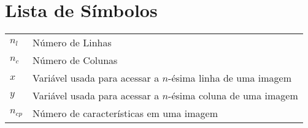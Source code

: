 \documentclass[11pt,twoside,a4paper]{book}
\renewcommand{\chaptermark}[1]{\markboth{\MakeUppercase{#1}}{}}
\begin{document}
\chapter{Lista de Símbolos}
\begin{tabular}{ll}
        $n_l$   & Número de Linhas\\
        $n_c$   & Número de Colunas\\
        $x$     & Variável usada para acessar a $n$-ésima linha de uma imagem \\
        $y$     & Variável usada para acessar a $n$-ésima coluna de uma imagem \\
        $n_{cp}$  & Número de características em uma imagem \\
\end{tabular}

\listoffigures            
\listoftables            

\mainmatter

\fancyhead[RE,LO]{\thesection}

\singlespacing              %


\renewcommand{\chaptermark}[1]{\markboth{\MakeUppercase{\appendixname\ \thechapter}} {\MakeUppercase{#1}} }
\fancyhead[RE,LO]{}
\appendix

\backmatter \singlespacing   %

\printindex   %
\end{document}
